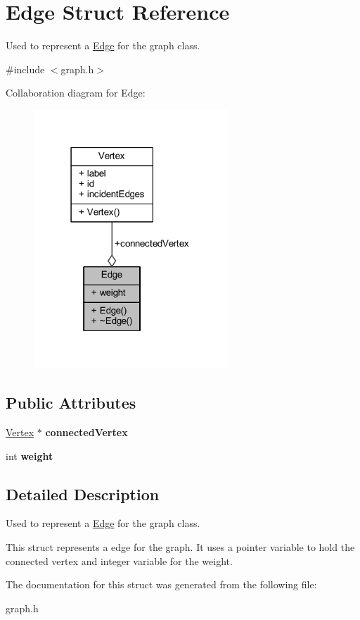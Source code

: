 \hypertarget{struct_edge}{}\section{Edge Struct Reference}
\label{struct_edge}


Used to represent a \hyperlink{struct_edge}{Edge} for the graph class.  




{\ttfamily \#include $<$graph.\+h$>$}



Collaboration diagram for Edge\+:\nopagebreak
\begin{figure}[H]
\begin{center}
\leavevmode
\includegraphics[width=207pt]{struct_edge__coll__graph}
\end{center}
\end{figure}
\subsection*{Public Attributes}
\begin{DoxyCompactItemize}
\item 
\mbox{\label{struct_edge_a60f98913cc48bc254567cdb52d592e1c}} 
\hyperlink{struct_vertex}{Vertex} $\ast$ {\bfseries connected\+Vertex}
\item 
\mbox{\label{struct_edge_a4d58e1f4de38fa55549497175981ebab}} 
int {\bfseries weight}
\end{DoxyCompactItemize}


\subsection{Detailed Description}
Used to represent a \hyperlink{struct_edge}{Edge} for the graph class. 

This struct represents a edge for the graph. It uses a pointer variable to hold the connected vertex and integer variable for the weight. 

The documentation for this struct was generated from the following file\+:\begin{DoxyCompactItemize}
\item 
graph.\+h\end{DoxyCompactItemize}

